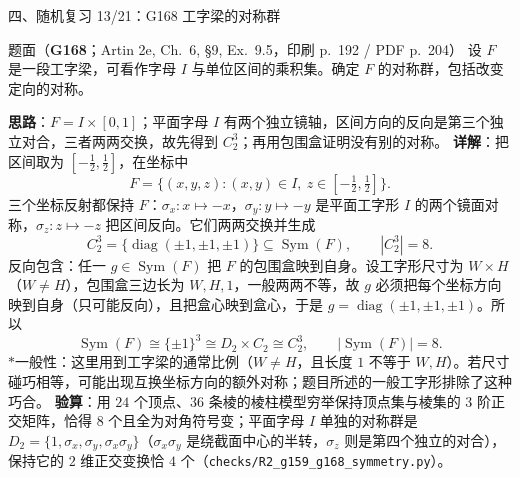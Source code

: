 \documentclass[aspectratio=169,10pt,fontset=none]{ctexbeamer}
\newcommand{\ex}[1]{\textcolor{accent}{\footnotesize\bfseries #1}}
\newcommand{\key}[1]{\textcolor{ink}{\bfseries #1}}
\newcommand{\starpt}{\textcolor{accent}{\bfseries$\ast$}}
\begin{document}
\begin{frame}[t]{四、随机复习 13/21：G168 工字梁的对称群}
\label{ex:G168}
\scriptsize
\begin{block}{\footnotesize 题面（\ex{G168}；Artin 2e, Ch.~6, §9, Ex.~9.5，印刷 p.~192 / PDF p.~204）}
设 $F$ 是一段工字梁，可看作字母 $I$ 与单位区间的乘积集。确定 $F$ 的对称群，包括改变定向的对称。
\end{block}
\key{思路}：$F=I\times[0,1]$；平面字母 $I$ 有两个独立镜轴，区间方向的反向是第三个独立对合，三者两两交换，故先得到 $C_2^3$；再用包围盒证明没有别的对称。
\key{详解}：把区间取为 $[-\tfrac12,\tfrac12]$，在坐标中
\[ F=\{(x,y,z):(x,y)\in I,\ z\in[-\tfrac12,\tfrac12]\}. \]
三个坐标反射都保持 $F$：$\sigma_x:x\mapsto-x$，$\sigma_y:y\mapsto-y$ 是平面工字形 $I$ 的两个镜面对称，$\sigma_z:z\mapsto-z$ 把区间反向。它们两两交换并生成
\[ C_2^3=\{\operatorname{diag}(\pm1,\pm1,\pm1)\}\subseteq\operatorname{Sym}(F),\qquad |C_2^3|=8. \]
反向包含：任一 $g\in\operatorname{Sym}(F)$ 把 $F$ 的包围盒映到自身。设工字形尺寸为 $W\times H$（$W\ne H$），包围盒三边长为 $W,H,1$，一般两两不等，故 $g$ 必须把每个坐标方向映到自身（只可能反向），且把盒心映到盒心，于是 $g=\operatorname{diag}(\pm1,\pm1,\pm1)$。所以
\[ \operatorname{Sym}(F)\cong\{\pm1\}^3\cong D_2\times C_2\cong C_2^3,\qquad |\operatorname{Sym}(F)|=8. \]
\starpt 一般性：这里用到工字梁的通常比例（$W\ne H$，且长度 $1$ 不等于 $W,H$）。若尺寸碰巧相等，可能出现互换坐标方向的额外对称；题目所述的一般工字形排除了这种巧合。
\key{验算}：用 $24$ 个顶点、$36$ 条棱的棱柱模型穷举保持顶点集与棱集的 $3$ 阶正交矩阵，恰得 $8$ 个且全为对角符号变；平面字母 $I$ 单独的对称群是 $D_2=\{1,\sigma_x,\sigma_y,\sigma_x\sigma_y\}$（$\sigma_x\sigma_y$ 是绕截面中心的半转，$\sigma_z$ 则是第四个独立的对合），保持它的 $2$ 维正交变换恰 $4$ 个（\texttt{checks/R2\_g159\_g168\_symmetry.py}）。
\end{frame}
\end{document}
